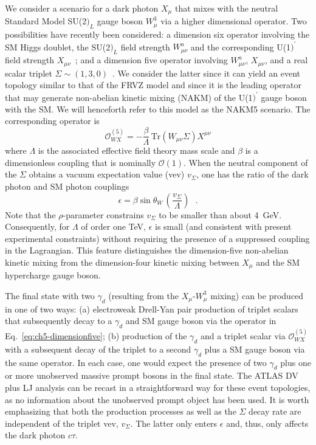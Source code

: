 We consider a scenario for a dark photon $X_\mu$ that mixes with the neutral Standard Model SU(2$)_L$ gauge boson $W_\mu^3$ via a higher dimensional operator. Two possibilities have recently been considered: a dimension six operator involving the SM Higgs doublet, the SU(2$)_L$ field strength $W_{\mu\nu}^a$ and the corresponding U(1$)^\prime$ field strength $X_{\mu\nu}$~\cite{Barello:2015bhq}; and a dimension five operator involving $W_{\mu\nu}^a$, $X_{\mu\nu}$, and a real scalar triplet $\Sigma\sim (1,3,0)$~\cite{Arguelles:2016ney}. We consider the latter since it can yield an event topology similar to that of the FRVZ model and since it is the leading operator that may generate non-abelian kinetic mixing (NAKM) of the U(1$)^\prime$ gauge boson with the SM. We will henceforth refer to this model as the NAKM5 scenario.
%
The corresponding operator is
\begin{equation}
\label{eq:ch5-dimensionfive}
\mathcal{O}_{WX}^{(5)} =
-\frac{\beta}{\Lambda}\,\text{Tr}\left(W_{\mu\nu}\Sigma\right) X^{\mu\nu}
\end{equation}
where $\Lambda$ is the associated effective field theory mass scale and $\beta$ is a dimensionless coupling that is nominally $\mathcal{O}(1)$. When the neutral component of the $\Sigma$ obtains a vacuum expectation value (vev) $v_\Sigma$, one has the ratio of the dark photon and SM photon couplings
\begin{equation}
\label{eq:ch5-dimfiveeps}
\epsilon = {\beta\sin\theta_W}\, \left(\frac{v_\Sigma}{\Lambda}\right)\ \ \  .
\end{equation}
Note that the $\rho$-parameter constrains $v_\Sigma$ to be smaller than about \mbox{4~GeV}. Consequently, for $\Lambda$ of order one TeV, $\epsilon$ is small (and consistent with present experimental constraints) without requiring the presence of a suppressed coupling in the Lagrangian. This feature distinguishes the dimension-five non-abelian kinetic mixing from the dimension-four kinetic mixing between $X_\mu$ and the SM hypercharge gauge boson.

The final state with two $\gamma_d$ (resulting from the $X_\mu$-$W_\mu^3$ mixing) can be produced in one of two ways: (a) electroweak Drell-Yan pair production of triplet scalars that subsequently decay to a $\gamma_d$ and SM gauge boson via the operator in Eq.~\eqref{eq:ch5-dimensionfive}; (b) production of the $\gamma_d$ and a triplet scalar via $\mathcal{O}_{WX}^{(5)}$ with a subsequent decay of the triplet to a second $\gamma_d$ plus a SM gauge boson via the same operator. In each case, one would expect the presence of two $\gamma_d$ plus one or more unobserved massive prompt bosons in the final state. The ATLAS DV plus LJ analysis can be recast in a straightforward way for these event topologies, as no information about the unobserved prompt object has been used. It is worth emphasizing that both the production processes as well as the $\Sigma$ decay rate are independent of the triplet vev, $v_\Sigma$. The latter only enters $\epsilon$ and, thus, only affects the dark photon $c\tau$.

